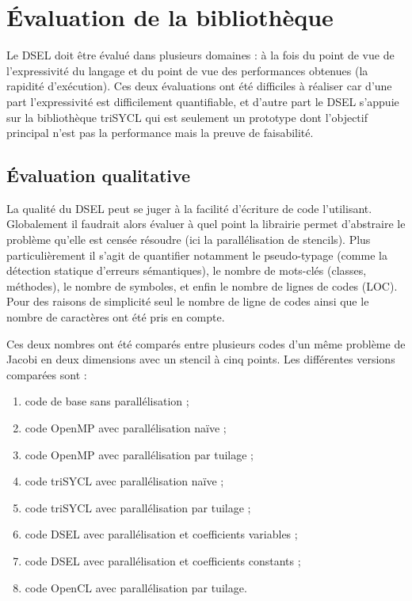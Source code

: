 
\chapter{\'Evaluation de la bibliothèque}

Le DSEL doit être évalué dans plusieurs domaines : à la fois du point de vue de l'expressivité du langage et du point de vue des performances obtenues (la rapidité d'exécution). Ces deux évaluations ont été difficiles à réaliser car d'une part l'expressivité est difficilement quantifiable, et d'autre part le DSEL s'appuie sur la bibliothèque \textsf{triSYCL} qui est seulement un prototype dont l'objectif principal n'est pas la performance mais la preuve de faisabilité.


\section{\'Evaluation qualitative}

La qualité du DSEL peut se juger à la facilité d'écriture de code l'utilisant. Globalement il faudrait alors évaluer à quel point la librairie permet d'abstraire le problème qu'elle est censée résoudre (ici la parallélisation de stencils). Plus particulièrement il s'agit de quantifier notamment le pseudo-typage (comme la détection statique d'erreurs sémantiques), le nombre de mots-clés (classes, méthodes), le nombre de symboles, et enfin le nombre de lignes de codes (LOC). Pour des raisons de simplicité seul le nombre de ligne de codes ainsi que le nombre de caractères ont été pris en compte. 

Ces deux nombres ont été comparés entre plusieurs codes d'un même problème de Jacobi en deux dimensions avec un stencil à cinq points. Les différentes versions comparées sont :
\begin{enumerate}
\item code de base sans parallélisation ;
\item code \textsf{OpenMP} avec parallélisation naïve ;
\item code \textsf{OpenMP} avec parallélisation par tuilage ;
\item code \textsf{triSYCL} avec parallélisation naïve ;
\item code \textsf{triSYCL} avec parallélisation par tuilage ;
\item code \textsf{DSEL} avec parallélisation et coefficients variables ;
\item code \textsf{DSEL} avec parallélisation et coefficients constants ;
\item code \textsf{OpenCL} avec parallélisation par tuilage.
\end{enumerate}

